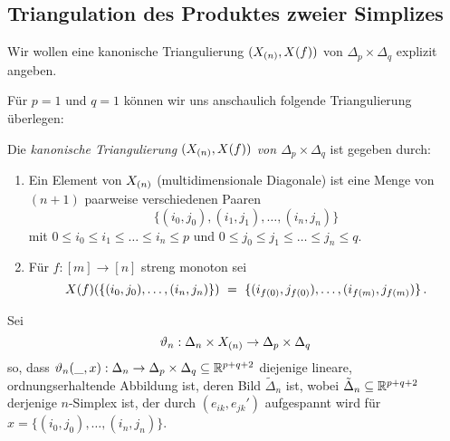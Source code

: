 \subsection{Triangulation des Produktes zweier Simplizes}

Wir wollen eine kanonische Triangulierung $(X_{(n)}, X(f))$ von
$\Delta_p\times \Delta_q$ explizit angeben.

\begin{beispiel}
  Für $p = 1$ und $q=1$ können wir uns anschaulich folgende Triangulierung
  überlegen:
  \begin{center}
  \end{center}
\end{beispiel}


\begin{definition}
  Die \emph{kanonische Triangulierung $(X_{(n)}, X(f))$ von 
  $\Delta_p\times\Delta_q$} ist gegeben durch:
  \begin{enumerate}
    \item Ein Element von $X_{(n)}$ (multidimensionale Diagonale)
      ist eine Menge von $(n+1)$ paarweise verschiedenen Paaren
      \[ \{(i_0,j_0), (i_1,j_1), \ldots, (i_n,j_n)\}\]
      mit $0\leq i_0\leq i_1 \leq\ldots\leq i_n \leq p$
      und $0\leq j_0 \leq j_1 \leq \ldots \leq j_n\leq q$.
    \item Für $f:[m] \to [n]$ streng monoton sei
      \[ X(f)(\{(i_0,j_0), \ldots, (i_n,j_n)\}) \ =\ 
        \{(i_{f(0)}, j_{f(0)}), \ldots, (i_{f(m)}, j_{f(m)})\} \,.\]
  \end{enumerate}
\end{definition}


\begin{definition}
  Sei
  \[ \vartheta_n: \Delta_n \times X_{(n)} \to \Delta_p\times\Delta_q\]
  so, dass $\vartheta_n(\_,x): \Delta_n \to \Delta_p\times\Delta_q \subseteq 
  \mathbb{R}^{p+q+2}$ diejenige lineare, ordnungserhaltende Abbildung ist, deren Bild
  $\tilde\Delta_n$ ist, wobei $\tilde\Delta_n\subseteq\mathbb{R}^{p+q+2}$ derjenige
  $n$-Simplex ist, der durch $(e_{ik},e_{jk}')$ aufgespannt wird für
  $x = \{(i_0,j_0),\ldots,(i_n,j_n)\}$.
\end{definition}

